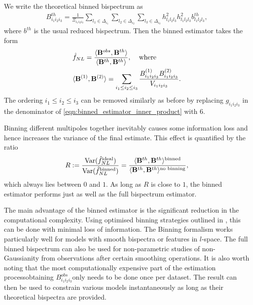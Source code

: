 We write the theoretical binned bispectrum as
\begin{align}
	B^{th}_{i_1 i_2 i_3} =  \frac{1}{\Xi_{i_1 i_2 i_3}} \sum_{l_1 \in \Delta_{i_1}} \sum_{l_2 \in \Delta_{i_2}} \sum_{l_3 \in \Delta_{i_3}} h^2_{l_1 l_2 l_3} h^2_{l_1 l_2 l_3} b^{th}_{l_1 l_2 l_3}, \label{eqn:binned_estimator_theoretical_bispectra}
\end{align}
where $b^{th}$ is the usual reduced bispectrum. Then the binned estimator takes the form
\begin{align}
	&\hat{f}_{NL} = \frac{\langle \mathbf{B}^{obs}, \mathbf{B}^{th} \rangle}{\langle \mathbf{B}^{th}, \mathbf{B}^{th} \rangle}, \;\;\;\;\text{where} \\
	&\langle \mathbf{B}^{(1)}, \mathbf{B}^{(2)} \rangle = \sum_{i_1 \le i_2 \le i_3} \frac{B^{(1)}_{i_1 i_2 i_3} B^{(2)}_{i_1 i_2 i_3}}{V_{i_1 i_2 i_3}}. \label{eqn:binned_estimator_inner_product}
\end{align}
The ordering $i_1 \le i_2 \le i_3$ can be removed similarly as before by replacing $g_{i_1 i_2 i_3}$ in the denominator of \eqref{eqn:binned_estimator_inner_product} with $6$.

Binning different multipoles together inevitably causes some information loss and hence increases the variance of the final estimate. This effect is quantified by the ratio
\begin{align}
	R := \frac{\text{Var}(\hat{f}^\text{ideal}_{NL})}{\text{Var}(\hat{f}^\text{binned}_{NL})} = \frac{\langle \mathbf{B}^{th}, \mathbf{B}^{th} \rangle^\text{binned}}{\langle \mathbf{B}^{th}, \mathbf{B}^{th} \rangle^\text{no binning}}, 
\end{align}
which always lies between $0$ and $1$. As long as $R$ is close to $1$, the binned estimator performs just as well as the full bispectrum estimator.

The main advantage of the binned estimator is the significant reduction in the computational complexity. Using optimised binning strategies outlined in \cite{Bucher2016}, this can be done with minimal loss of information. The Binning formalism works particularly well for models with smooth bispectra or features in $l$-space. The full binned bispectrum can also be used for non-parametric studies of non-Gaussianity from observations after certain smoothing operations. It is also worth noting that the most computationally expensive part of the estimation process\textemdash obtaining $B^{obs}_{i_1 i_2 i_3}$\textemdash only needs to be done once per dataset. The result can then be used to constrain various models instantaneously as long as their theoretical bispectra are provided.

